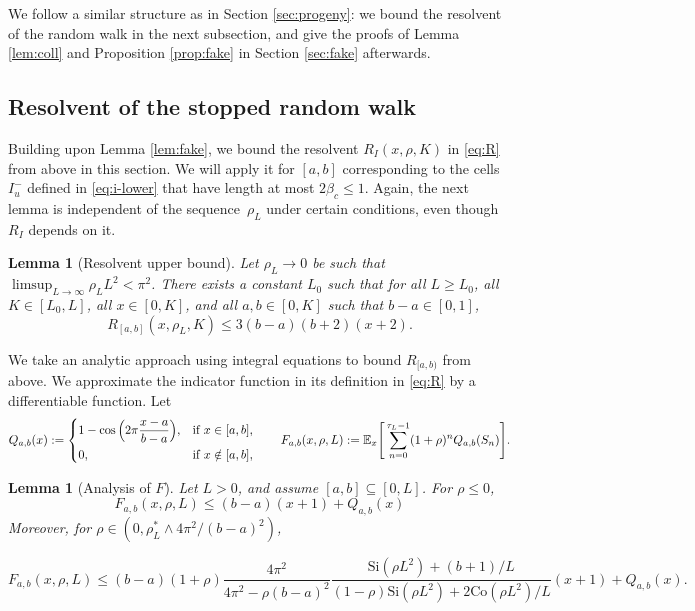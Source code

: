 \documentclass[a4paper, a4wide, 10pt, reqno]{amsart}
\theoremstyle{plain}
\newtheorem{lemma}[theorem]{Lemma}
\theoremstyle{definition}
\numberwithin{equation}{section}
\newcommand{\E}{\mathbb E}
\newcommand{\Co}{{\mathrm{Co}}}
\newcommand{\Si}{{\mathrm{Si}}}
\begin{document}
We follow a similar structure as in Section \ref{sec:progeny}:
we bound the resolvent of the random walk in the next subsection, and give the proofs of Lemma \ref{lem:coll} and Proposition \ref{prop:fake} in Section \ref{sec:fake} afterwards.

\subsection{Resolvent of the stopped random walk}
Building upon Lemma \ref{lem:fake}, we bound the resolvent $R_I(x, \rho, K)$ in \eqref{eq:R} from above in this section. We will apply it for $[a,b]$ corresponding to the cells $I_u^-$ defined in \eqref{eq:i-lower} that have length at most $2\beta_c\le 1$. Again, the next lemma is independent of the sequence~$\rho_L$ under certain conditions, even though $R_I$ depends on it.
\begin{lemma}[Resolvent upper bound]\label{lem:resolvent}
    Let $\rho_L\to0$ be such that $\limsup_{L\to\infty}\rho_L L^2<\pi^2$. There exists a constant $L_0$ such that for all $L\ge L_0$, all $K\in[L_0,L]$,  all $x\in[0,K]$, and all  $a,b\in[0,K]$ such that $b-a\in[0, 1]$,
    \[
    R_{[a,b]}(x, \rho_L, K) \le 3(b-a)(b+2)(x+2)
.\]
\end{lemma}
We  take an analytic approach using integral equations to bound $R_{[a,b)}$ from above. We approximate the indicator function in its definition in \eqref{eq:R} by a differentiable function. Let 
\begin{equation}\label{eq:q}
Q_{a,b}(x) := \begin{dcases}
        1-\cos\Big(2\pi\frac{x-a}{b-a}\Big),&\text{if }x\in[a,b], \\
        0,&\text{if }x\notin[a,b],
    \end{dcases} 
    \qquad
     F_{a,b}(x,\rho, L) := \E_x\Bigg[\sum_{n=0}^{\tau_L-1}(1+\rho)^nQ_{a,b}(S_n)\Bigg].
\end{equation}
\begin{lemma}[Analysis of $F$]\label{lem:upper-f}
Let $L>0$, and assume $[a,b]\subseteq[0, L]$. For $\rho\le 0$,
\begin{equation}\label{eq:upper-f0}
F_{a,b}(x, \rho, L) \le (b-a)(x+1)
+ Q_{a,b}(x)
\end{equation}
Moreover, for $\rho\in(0, \rho^*_L\wedge 4\pi^2/(b-a)^2)$,

\begin{equation}\label{eq:upper-fpos}
F_{a,b}(x, \rho, L) \le (b-a)(1+\rho)\frac{4\pi^2}{4\pi^2-\rho(b-a)^2}\frac{\Si(\rho L^2)+(b+1)/L}{(1-\rho)\Si(\rho L^2)+2\Co(\rho L^2)/L}(x+1)
+ Q_{a,b}(x).
\end{equation}
\end{lemma}
\end{document}
